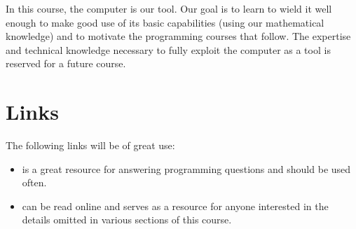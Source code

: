 \documentclass{ximera}
\begin{document}
In this course, the computer is our tool. Our goal is to learn to wield it well enough to make good use of its basic capabilities (using our mathematical knowledge) and to motivate the programming courses that follow. The expertise and technical knowledge necessary to fully exploit the computer as a tool is reserved for a future course. 

\section{Links}

The following links will be of great use:

\begin{itemize}
	\item {} is a great resource for answering programming questions and should be used often.
	\item {} can be read online and serves as a resource for anyone interested in the details omitted in various sections of this course.
\end{itemize}
\end{document}
